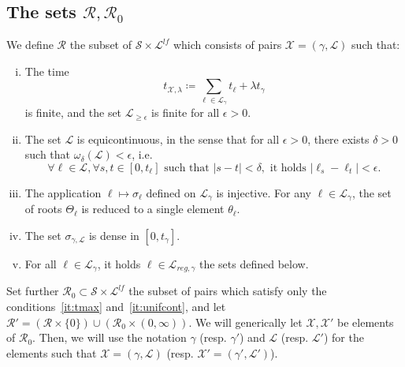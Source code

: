 \documentclass[11pt]{article}
\def\Conf{{\mathscr{R}}}
\begin{document}
\subsection{The sets \texorpdfstring{$\Conf,\Conf_0$}{R,R0}}
\label{sub:sets}
We define $\Conf$ the subset of $\mathscr{S}\times \mathscr{L}^{lf}$ which consists of pairs $\mathcal{X}=(\gamma,\mathcal{L})$ such that:
\begin{enumerate}[(i)]
\item \label{it:tmax} The time \[ t_{\mathcal{X},\lambda}\coloneqq
\sum_{\ell \in \mathcal{L}_\gamma} t_\ell +\lambda t_\gamma
\] is finite, and the set $\mathcal{L}_{\geq \epsilon}$ is finite for all $\epsilon>0$.
\item \label{it:unifcont} The set $\mathcal{L}$ is equicontinuous, in the sense that for all $\epsilon>0$, there exists $\delta>0$ such that $\omega_\delta(\mathcal{L})<\epsilon$, i.e.
\[
\forall \ell\in \mathcal{L}, \forall s,t\in [0,t_\ell] \mbox{ such that } |s-t|<\delta, \mbox{ it holds } |\ell_s-\ell_t|< \epsilon.
\]
\item \label{it:inj} The application $\ell\mapsto \sigma_\ell$ defined on $\mathcal{L}_\gamma$ is injective. For any $\ell\in \mathcal{L}_\gamma$, the set of roots $\Theta_\ell$ is reduced to a single element $\theta_\ell$.
\item \label{it:dense} The set $\sigma_{\gamma,  \mathcal{L}}$ is dense in $ [0,t_\gamma]$.
\item \label{it:reg} For all $\ell \in \mathcal{L}_\gamma$, it holds $\ell\in \mathscr{L}_{reg,\gamma}$ the sets defined below.
\end{enumerate}
Set further $\Conf_0\subset \mathscr{S}\times \mathscr{L}^{lf}$ the subset of pairs which satisfy only the conditions~\eqref{it:tmax} and~\eqref{it:unifcont}, and let
$\Conf'=(\Conf\times \{0\})\cup (\Conf_0\times(0,\infty))$.
We will generically let $\mathcal{X},\mathcal{X}'$ be elements of $\Conf_0$. Then, we will use the notation $\gamma$ (resp. $\gamma'$) and $\mathcal{L}$ (resp. $\mathcal{L}'$) for the elements such that $\mathcal{X}=(\gamma,\mathcal{L})$ (resp. $\mathcal{X}'=(\gamma',\mathcal{L}')$).
\end{document}
